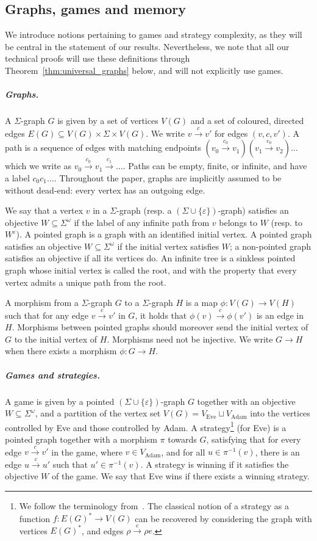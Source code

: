 \documentclass[a4paper,UKenglish,cleveref, thm-restate]{lipics-v2021}
\newcommand{\re}[1]{\xrightarrow{#1}}
\newcommand{\eps}{\varepsilon}
\newcommand{\Eve}{\text{Eve}}
\newcommand{\Adam}{\text{Adam}}
\renewcommand{\SS}{\Sigma}
\begin{document}
\subsection{Graphs, games and memory}

We introduce notions pertaining to games and strategy complexity, as they will be central in the statement of our results.
Nevertheless, we note that all our technical proofs will use these definitions through Theorem~\ref{thm:universal_graphs} below, and will not explicitly use games.

\subparagraph*{Graphs.}
A $\SS$-graph $G$ is given by a set of vertices $V(G)$ and a set of coloured, directed edges $E(G) \subseteq V(G) \times \SS \times V(G)$.
We write $v \re c v'$ for edges $(v,c,v')$.
A path is a sequence of edges with matching endpoints $(v_0 \re {c_0} v_1)(v_1 \re{c_0} v_2) \dots$ which we write as $v_0 \re {c_0} v_1 \re{c_1} \dots$.
Paths can be empty, finite, or infinite, and have a label $c_0c_1\dots$.
Throughout the paper, graphs are implicitly assumed to be without dead-end: every vertex has an outgoing edge.

We say that a vertex $v$ in a $\Sigma$-graph (resp. a $(\Sigma \cup \{\eps\})$-graph) satisfies an objective $W \subseteq \Sigma^\omega$ if the label of any infinite path from $v$ belongs to $W$ (resp. to $W^\eps$).
A pointed graph is a graph with an identified initial vertex.
A pointed graph satisfies an objective $W \subseteq \Sigma^\omega$ if the initial vertex satisfies $W$; a non-pointed graph satisfies an objective if all its vertices do.
An infinite tree is a sinkless pointed graph whose initial vertex is called the root, and with the property that every vertex admits a unique path from the root.

A morphism from a $\Sigma$-graph $G$ to a $\Sigma$-graph $H$ is a map $\phi: V(G) \to V(H)$ such that for any edge $v \re c v'$ in $G$, it holds that $\phi(v) \re c \phi(v')$ is an edge in $H$.
Morphisms between pointed graphs should moreover send the initial vertex of $G$ to the initial vertex of $H$.
Morphisms need not be injective.
We write $G \re{} H$ when there exists a morphism $\phi \colon G \to H$.

\subparagraph*{Games and strategies.}
A game is given by a pointed $(\Sigma \cup \{\eps\})$-graph $G$ together with an objective $W \subseteq \Sigma^\omega$, and a partition of the vertex set $V(G)=V_\Eve \sqcup V_\Adam$ into the vertices controlled by Eve and those controlled by Adam.
A strategy\footnote{We follow the terminology from~\cite{CO25LMCS}. The classical notion of a strategy as a function $f\colon E(G)^*\to V(G)$ can be recovered by considering the graph with vertices $E(G)^*$, and edges $\rho \re e \rho e$.} (for Eve) is a pointed graph together with a morphism $\pi$ towards $G$, satisfying that for every edge $v \re c v'$ in the game, where $v \in V_\Adam$, and for all $u \in \pi^{-1}(v)$, there is an edge $u \re c u'$ such that $u' \in \pi^{-1}(v)$.
A strategy is winning if it satisfies the objective $W$ of the game.
We say that Eve wins if there exists a winning strategy.
\end{document}
